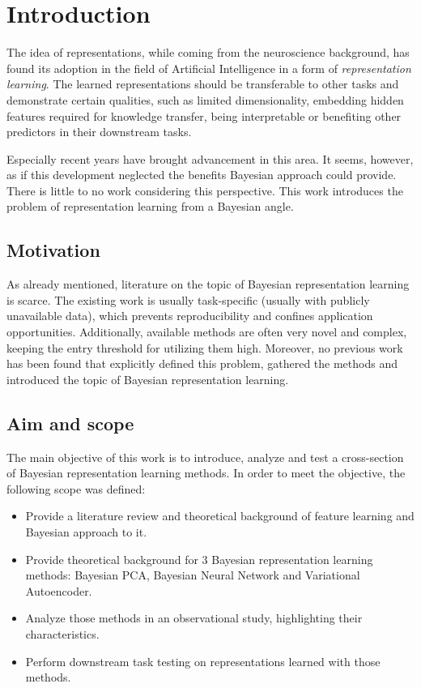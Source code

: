 \chapter{Introduction}\label{chapter:intro}
\thispagestyle{chapterBeginStyle}
The idea of representations, while coming from the neuroscience background, has found its adoption in the field of Artificial Intelligence in a form of \textit{representation learning}. The learned representations should be transferable to other tasks and demonstrate certain qualities, such as limited dimensionality, embedding hidden features required for knowledge transfer, being interpretable or benefiting other predictors in their downstream tasks.

\vspace{\baselineskip}
Especially recent years have brought advancement in this area. It seems, however, as if this development neglected the benefits Bayesian approach could provide. There is little to no work considering this perspective. This work introduces the problem of representation learning from a Bayesian angle.

\section{Motivation}
As already mentioned, literature on the topic of Bayesian representation learning is scarce. The existing work is usually task-specific (usually with publicly unavailable data), which prevents reproducibility and confines application opportunities. Additionally, available methods are often very novel and complex, keeping the entry threshold for utilizing them high. Moreover, no previous work has been found that explicitly defined this problem, gathered the methods and introduced the topic of Bayesian representation learning.

\section{Aim and scope}\label{sec:scope}
The main objective of this work is to introduce, analyze and test a cross-section of Bayesian representation learning methods. In order to meet the objective, the following scope was defined:

\begin{itemize}
    \item Provide a literature review and theoretical background of feature learning and Bayesian approach to it.
    \item Provide theoretical background for 3 Bayesian representation learning methods: Bayesian PCA, Bayesian Neural Network and Variational Autoencoder.
    \item Analyze those methods in an observational study, highlighting their characteristics.
    \item Perform downstream task testing on representations learned with those methods.
\end{itemize}

